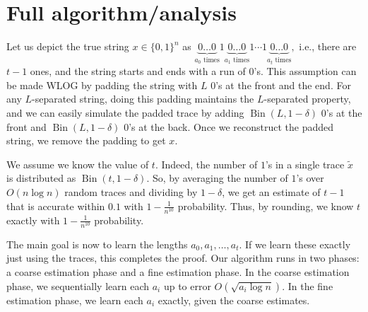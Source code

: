 \documentclass[12pt]{article}
\theoremstyle{definition}
\theoremstyle{remark}
\DeclareMathOperator{\Bin}{Bin}
\begin{document}
\iffalse
    \begin{figure}[!ht]
    \centering
    \resizebox{\textwidth}{!}{\begin{circuitikz}
    \tikzstyle{every node}=[font=\small]
    \draw (3,1) to[short] (9.75,1);
    \draw (3,0) to[short] (8.5,0);
    \draw [short] (8.5,0) -- (9.75,1);
    \draw [short] (8,0) -- (9.25,1);
    \draw [short] (7.0,0) -- (8.25,1);
    \draw [short] (4.25,0) -- (5.5,1);
    \draw [short] (4,0) -- (4.75,1);
    \node [font=\tiny] at (9.55,1.2) {$a_{m}$};
    \node [font=\tiny] at (8.3,-0.25) {$b_{m-k}$};
    \node [font=\tiny] at (8.75,1.2) {$a_{m-1}$};
    \node [font=\tiny] at (7.4,-0.25) {$b_{m-k-1}$};
    \node [font=\small] at (6.25,0.5) {$\mathbf{\cdots}$};
    \node [font=\tiny] at (5.15,1.2) {$a_{m-h}$};
    \node [font=\tiny] at (4.1,-0.25) {$b_{m-k-h}$};
    \node [font=\small] at (3.6,0.5) {$\mathbf{\cdots}$};
    \end{circuitikz}
    }\label{fig:my_label}
    \end{figure}
\fi


\section{Full algorithm/analysis} \label{sec:algorithm}

Let us depict the true string $x \in \{0, 1\}^n$ as $\underbrace{0 \dots 0}_{a_0 \text{ times}} 1 \underbrace{0 \dots 0}_{a_1 \text{ times}} 1 \cdots 1 \underbrace{0 \dots 0}_{a_t \text{ times}},$ i.e., there are $t-1$ ones, and the string starts and ends with a run of $0$'s. This assumption can be made WLOG by padding the string with $L$ $0$'s at the front and the end. For any $L$-separated string, doing this padding maintains the $L$-separated property, and we can easily simulate the padded trace by adding $\Bin(L, 1-\delta)$ $0$'s at the front and $\Bin(L, 1-\delta)$ $0$'s at the back. Once we reconstruct the padded string, we remove the padding to get $x$.


We assume we know the value of $t$. Indeed, the number of $1$'s in a single trace $\tilde{x}$ is distributed as $\Bin(t, 1-\delta)$. So, by averaging the number of $1$'s over $O(n \log n)$ random traces and dividing by $1-\delta$, we get an estimate of $t-1$ that is accurate within $0.1$ with $1-\frac{1}{n^{10}}$ probability. Thus, by rounding, we know $t$ exactly with $1-\frac{1}{n^{10}}$ probability.

The main goal is now to learn the lengths $a_0, a_1, \dots, a_t$. If we learn these exactly just using the traces, this completes the proof. Our algorithm runs in two phases: a coarse estimation phase and a fine estimation phase. In the coarse estimation phase, we sequentially learn each $a_i$ up to error $O(\sqrt{a_i \log n})$. In the fine estimation phase, we learn each $a_i$ exactly, given the coarse estimates.
\end{document}

